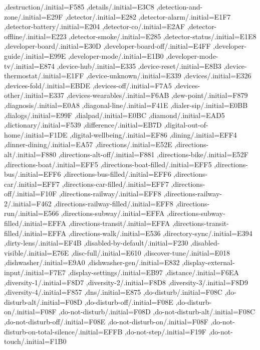 { ,destruction/.initial=F585
 ,details/.initial=E3C8
 ,detection-and-zone/.initial=E29F
 ,detector/.initial=E282
 ,detector-alarm/.initial=E1F7
 ,detector-battery/.initial=E204
 ,detector-co/.initial=E2AF
 ,detector-offline/.initial=E223
 ,detector-smoke/.initial=E285
 ,detector-status/.initial=E1E8
 ,developer-board/.initial=E30D
 ,developer-board-off/.initial=E4FF
 ,developer-guide/.initial=E99E
 ,developer-mode/.initial=E1B0
 ,developer-mode-tv/.initial=E874
 ,device-hub/.initial=E335
 ,device-reset/.initial=E8B3
 ,device-thermostat/.initial=E1FF
 ,device-unknown/.initial=E339
 ,devices/.initial=E326
 ,devices-fold/.initial=EBDE
 ,devices-off/.initial=F7A5
 ,devices-other/.initial=E337
 ,devices-wearables/.initial=F6AB
 ,dew-point/.initial=F879
 ,diagnosis/.initial=E0A8
 ,diagonal-line/.initial=F41E
 ,dialer-sip/.initial=E0BB
 ,dialogs/.initial=E99F
 ,dialpad/.initial=E0BC
 ,diamond/.initial=EAD5
 ,dictionary/.initial=F539
 ,difference/.initial=EB7D
 ,digital-out-of-home/.initial=F1DE
 ,digital-wellbeing/.initial=EF86
 ,dining/.initial=EFF4
 ,dinner-dining/.initial=EA57
 ,directions/.initial=E52E
 ,directions-alt/.initial=F880
 ,directions-alt-off/.initial=F881
 ,directions-bike/.initial=E52F
 ,directions-boat/.initial=EFF5
 ,directions-boat-filled/.initial=EFF5
 ,directions-bus/.initial=EFF6
 ,directions-bus-filled/.initial=EFF6
 ,directions-car/.initial=EFF7
 ,directions-car-filled/.initial=EFF7
 ,directions-off/.initial=F10F
 ,directions-railway/.initial=EFF8
 ,directions-railway-2/.initial=F462
 ,directions-railway-filled/.initial=EFF8
 ,directions-run/.initial=E566
 ,directions-subway/.initial=EFFA
 ,directions-subway-filled/.initial=EFFA
 ,directions-transit/.initial=EFFA
 ,directions-transit-filled/.initial=EFFA
 ,directions-walk/.initial=E536
 ,directory-sync/.initial=E394
 ,dirty-lens/.initial=EF4B
 ,disabled-by-default/.initial=F230
 ,disabled-visible/.initial=E76E
 ,disc-full/.initial=E610
 ,discover-tune/.initial=E018
 ,dishwasher/.initial=E9A0
 ,dishwasher-gen/.initial=E832
 ,display-external-input/.initial=F7E7
 ,display-settings/.initial=EB97
 ,distance/.initial=F6EA
 ,diversity-1/.initial=F8D7
 ,diversity-2/.initial=F8D8
 ,diversity-3/.initial=F8D9
 ,diversity-4/.initial=F857
 ,dns/.initial=E875
 ,do-disturb/.initial=F08C
 ,do-disturb-alt/.initial=F08D
 ,do-disturb-off/.initial=F08E
 ,do-disturb-on/.initial=F08F
 ,do-not-disturb/.initial=F08D
 ,do-not-disturb-alt/.initial=F08C
 ,do-not-disturb-off/.initial=F08E
 ,do-not-disturb-on/.initial=F08F
 ,do-not-disturb-on-total-silence/.initial=EFFB
 ,do-not-step/.initial=F19F
 ,do-not-touch/.initial=F1B0
}
